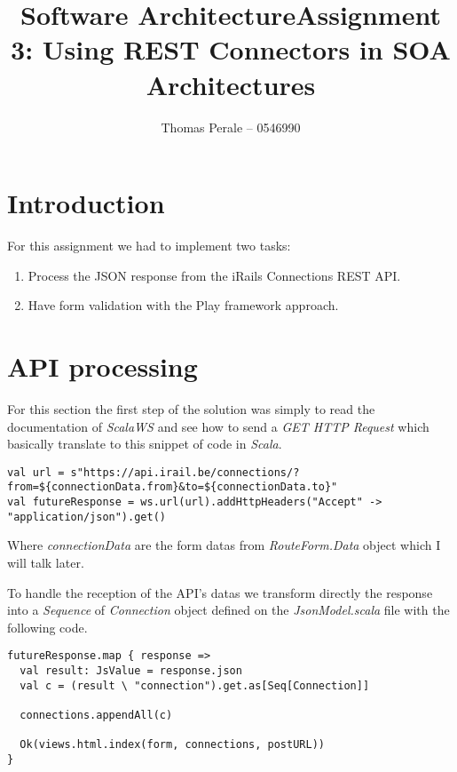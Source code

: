 \documentclass[a4paper,11pt]{article}
\begin{document}
\title{Software Architecture}
\title{Assignment 3: Using REST Connectors in SOA Architectures}
\author{Thomas Perale -- 0546990}

\maketitle

\section{Introduction}

For this assignment we had to implement two tasks:

\begin{enumerate}
  \item Process the JSON response from the iRails Connections REST API.
  \item Have form validation with the Play framework approach.
\end{enumerate}

\section{API processing}

For this section the first step of the solution was simply to read the
documentation of \emph{ScalaWS} and see how to send a \emph{GET HTTP Request} which
basically translate to this snippet of code in \emph{Scala}.

\begin{lstlisting}[style=scala]
val url = s"https://api.irail.be/connections/?from=${connectionData.from}&to=${connectionData.to}"
val futureResponse = ws.url(url).addHttpHeaders("Accept" -> "application/json").get()
\end{lstlisting}

Where \emph{connectionData} are the form datas from \emph{RouteForm.Data} object
which I will talk later.

To handle the reception of the API's datas we transform directly the response
into a \emph{Sequence} of \emph{Connection} object defined on the \emph{JsonModel.scala}
file with the following code.

\begin{lstlisting}[style=scala]
futureResponse.map { response =>
  val result: JsValue = response.json
  val c = (result \ "connection").get.as[Seq[Connection]]

  connections.appendAll(c)

  Ok(views.html.index(form, connections, postURL))
}
\end{lstlisting}
\end{document}
